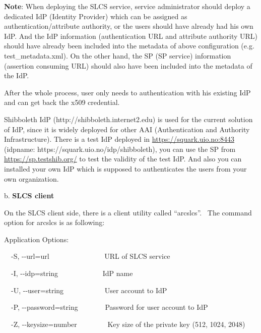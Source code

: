 \documentclass{article}
\begin{document}
{\color{black}
\textbf{Note}: When deploying the SLCS service, service administrator
should deploy a dedicated IdP (Identity Provider) which can be assigned
as authentication/attribute authority, or the users should have already
had his own IdP. And the IdP information (authentication URL and
attribute authority URL) should have already been included into the
metadata of above configuration (e.g. test\_metadata.xml). On the other
hand, the SP (SP service) information (assertion consuming URL) should
also have been included into the metadata of the IdP.}

{\color{black}
After the whole process, user only needs to authentication with his
existing IdP and can get back the x509 credential.}

{\color{black}
Shibboleth IdP (http://shibboleth.internet2.edu) is used for the current
solution of IdP, since it is widely deployed for other AAI
(Authentication and Authority Infrastructure). There is a test IdP
deployed in
\href{https://squark.uio.no:8443/}{https://squark.uio.no:8443}
(idpname: https://squark.uio.no/idp/shibboleth), you can use the SP
from \url{https://sp.testshib.org/} to test the validity of the test
IdP. And also you can installed your own IdP which is supposed to
authenticates the users from your own organization.}

{\color{black}
b. \textbf{SLCS client}}

{\color{black}
On the SLCS client side, there is a client utility called
{\textquotedblleft}arcslcs{\textquotedblright}. \ The command option
for arcslcs is as following:}

{\color{black}
Application Options:}

{\color{black}
\ \ {}-S, -{}-url=url \ \ \ \ \ \ \ \ \ \ \ \ \ \ \ URL of SLCS service}

{\color{black}
\ \ {}-I, -{}-idp=string \ \ \ \ \ \ \ \ \ \ \ \ IdP name}

{\color{black}
\ \ {}-U, -{}-user=string \ \ \ \ \ \ \ \ \ \ \ User account to IdP}

{\color{black}
\ \ {}-P, -{}-password=string \ \ \ \ \ \ \ Password for user account to
IdP}

{\color{black}
\ \ {}-Z, -{}-keysize=number \ \ \ \ \ \ \ \ Key size of the private key
(512, 1024, 2048)}
\end{document}
